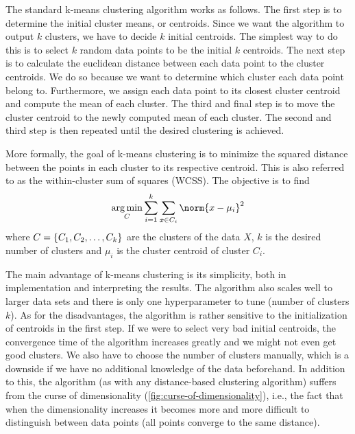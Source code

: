 The standard k-means clustering algorithm works as follows. The first step is to determine the initial cluster means, or centroids. Since we want the algorithm to output $k$ clusters, we have to decide $k$ initial centroids. The simplest way to do this is to select $k$ random data points to be the initial $k$ centroids. The next step is to calculate the euclidean distance between each data point to the cluster centroids. We do so because we want to determine which cluster each data point belong to. Furthermore, we assign each data point to its closest cluster centroid and compute the mean of each cluster. The third and final step is to move the cluster centroid to the newly computed mean of each cluster. The second and third step is then repeated until the desired clustering is achieved.

More formally, the goal of k-means clustering is to minimize the squared distance between the points in each cluster to its respective centroid. This is also referred to as the within-cluster sum of squares (WCSS). The objective is to find
\begin{align}
    \argmin_{C} \sumlim{i=1}{k} \sumlim{x \in C_i}{} \norm{x - \mu_i}^2
\end{align}
where $C = \left\{C_1, C_2, \ldots, C_k\right\}$ are the clusters of the data $X$, $k$ is the desired number of clusters and $\mu_i$ is the cluster centroid of cluster $C_i$.

The main advantage of k-means clustering is its simplicity, both in implementation and interpreting the results. The algorithm also scales well to larger data sets and there is only one hyperparameter to tune (number of clusters $k$). As for the disadvantages, the algorithm is rather sensitive to the initialization of centroids in the first step. If we were to select very bad initial centroids, the convergence time of the algorithm increases greatly and we might not even get good clusters. We also have to choose the number of clusters manually, which is a downside if we have no additional knowledge of the data beforehand. In addition to this, the algorithm (as with any distance-based clustering algorithm) suffers from the curse of dimensionality (\cref{fig:curse-of-dimensionality}), i.e., the fact that when the dimensionality increases it becomes more and more difficult to distinguish between data points (all points converge to the same distance).

